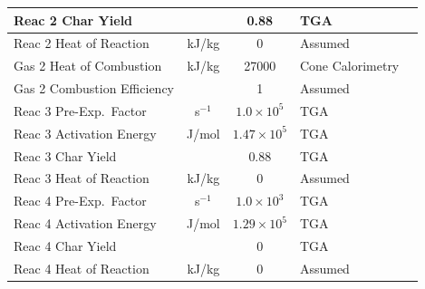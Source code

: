 \begin{table}[p]
\begin{center}
\begin{tabular}{|l|c|c|l|l|}
Reac 2 Char Yield           &               & 0.88                              & TGA                       &  \cite{Oztekin:CF2012}                  \\ \hline
Reac 2 Heat of Reaction     & kJ/kg         & 0                                 & Assumed                   &  \cite{Oztekin:CF2012}                  \\ \hline
Gas 2 Heat of Combustion    & kJ/kg         & 27000                             & Cone Calorimetry          &  \cite{Oztekin:CF2012}                  \\ \hline
Gas 2 Combustion Efficiency &               & 1                                 & Assumed                   &  \cite{Oztekin:CF2012}                  \\ \hline
Reac 3 Pre-Exp.~Factor      & s$^{-1}$      & $1.0 \times 10^5$                 & TGA                       &  \cite{Oztekin:CF2012}                  \\ \hline
Reac 3 Activation Energy    & J/mol       & $1.47 \times 10^5$                & TGA                       &  \cite{Oztekin:CF2012}                  \\ \hline
Reac 3 Char Yield           &               & 0.88                              & TGA                       &  \cite{Oztekin:CF2012}                  \\ \hline
Reac 3 Heat of Reaction     & kJ/kg         & 0                                 & Assumed                   &  \cite{Oztekin:CF2012}                  \\ \hline
Reac 4 Pre-Exp.~Factor      & s$^{-1}$      & $1.0 \times 10^3$                 & TGA                       &  \cite{Oztekin:CF2012}                  \\ \hline
Reac 4 Activation Energy    & J/mol       & $1.29 \times 10^5$                & TGA                       &  \cite{Oztekin:CF2012}                  \\ \hline
Reac 4 Char Yield           &               & 0                                 & TGA                       &  \cite{Oztekin:CF2012}                  \\ \hline
Reac 4 Heat of Reaction     & kJ/kg         & 0                                 & Assumed                   &  \cite{Oztekin:CF2012}                  \\ \hline
\end{tabular}
\end{center}
\label{Properties_PEEK}
\end{table}

